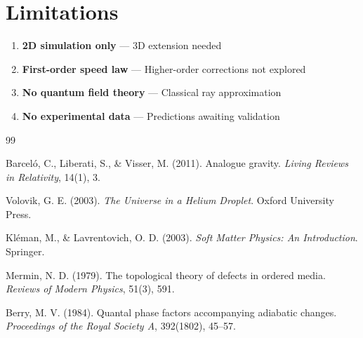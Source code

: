 \documentclass[11pt,a4paper]{article}
\begin{document}
\section{Limitations}

\begin{enumerate}
    \item \textbf{2D simulation only} --- 3D extension needed
    \item \textbf{First-order speed law} --- Higher-order corrections not explored
    \item \textbf{No quantum field theory} --- Classical ray approximation
    \item \textbf{No experimental data} --- Predictions awaiting validation
\end{enumerate}

\begin{thebibliography}{99}

Barcel{\'o}, C., Liberati, S., \& Visser, M. (2011). Analogue gravity. \textit{Living Reviews in Relativity}, 14(1), 3.

Volovik, G. E. (2003). \textit{The Universe in a Helium Droplet}. Oxford University Press.

Kl{\'e}man, M., \& Lavrentovich, O. D. (2003). \textit{Soft Matter Physics: An Introduction}. Springer.

Mermin, N. D. (1979). The topological theory of defects in ordered media. \textit{Reviews of Modern Physics}, 51(3), 591.

Berry, M. V. (1984). Quantal phase factors accompanying adiabatic changes. \textit{Proceedings of the Royal Society A}, 392(1802), 45--57.

\end{thebibliography}
\end{document}
